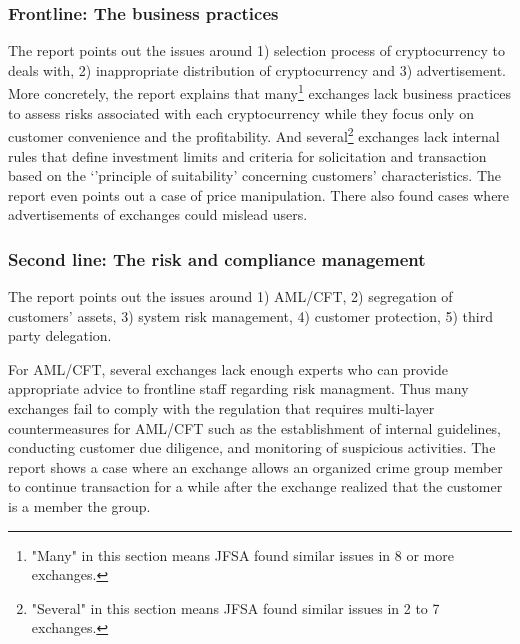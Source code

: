 \subsubsection{Frontline: The business practices}
The report points out the issues around 1) selection process of cryptocurrency to deals with, 2) inappropriate distribution of cryptocurrency and 3) advertisement.
More concretely, the report explains that many\footnote{"Many" in this section means JFSA found similar issues in 8 or more exchanges.} exchanges lack business practices to assess risks associated with each cryptocurrency while they focus only on customer convenience and the profitability. And several\footnote{"Several" in this section means JFSA found similar issues in 2 to 7 exchanges.} exchanges lack internal rules that define investment limits and criteria for solicitation and transaction based on the `'principle of suitability' concerning customers' characteristics. The report even points out a case of price manipulation. There also found cases where advertisements of exchanges could mislead users.

\subsubsection{Second line: The risk and compliance management}
The report points out the issues around 1) AML/CFT, 2) segregation of customers' assets, 3) system risk management, 4) customer protection, 5) third party delegation.

For AML/CFT, several exchanges lack enough experts who can provide appropriate advice to frontline staff regarding risk managment. Thus many exchanges fail to comply with the regulation that requires multi-layer countermeasures for AML/CFT such as the establishment of internal guidelines, conducting customer due diligence, and monitoring of suspicious activities. The report shows a case where an exchange allows an organized crime group member to continue transaction for a while after the exchange realized that the customer is a member the group.

